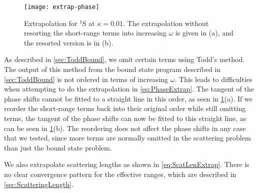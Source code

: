 \documentclass[Dissertation.tex]{subfiles}
\begin{document}
\begin{figure}
	\centering
	\texttt{[image: extrap-phase]}
	\caption[Extrapolation for $^1$S at $\kappa = 0.01$]{Extrapolation for $^1$S at $\kappa = 0.01$. The extrapolation without resorting the short-range terms into increasing $\omega$ is given in (a), and the resorted version is in (b).}
	\label{fig:extrap-phase}
\end{figure}

As described in \cref{sec:ToddBound}, we omit certain terms using 
Todd's method. The output of this method from the bound state program 
described in \cref{sec:ToddBound} is not ordered in terms of 
increasing $\omega$. This leads to difficulties when attempting to do the 
extrapolation in \cref{eq:PhaseExtrap}. The tangent of the phase 
shifts cannot be fitted to a straight line in this order, as seen in
\cref{fig:extrap-phase}(a). If we reorder the 
short-range terms back into their original order while still omitting terms, 
the tangent of the phase shifts can now be fitted to this straight line, as 
can be seen in \cref{fig:extrap-phase}(b). The reordering does not affect 
the phase shifts in any case that we tested, since more terms are normally 
omitted in the scattering problem than just the bound state problem.

We also extrapolate scattering lengths as shown in \cref{eq:ScatLenExtrap}.
There is no clear convergence pattern for the effective ranges, which are
described in \cref{sec:ScatteringLength}.


\biblio
\end{document}
